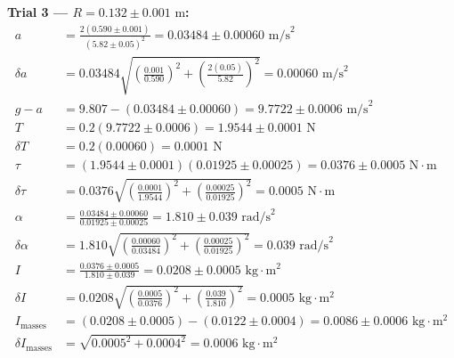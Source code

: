 \documentclass[11pt]{article}
\begin{document}
\textbf{Trial 3 — $R = 0.132 \pm 0.001\text{ m}$:}
\begin{align*}
a &= \frac{2(0.590 \pm 0.001)}{(5.82 \pm 0.05)^2} = 0.03484 \pm 0.00060\text{ m/s}^2 \\
\delta a &= 0.03484\sqrt{\left(\frac{0.001}{0.590}\right)^2 + \left(\frac{2(0.05)}{5.82}\right)^2} = 0.00060\text{ m/s}^2 \\
g - a &= 9.807 - (0.03484 \pm 0.00060) = 9.7722 \pm 0.0006\text{ m/s}^2 \\
T &= 0.2(9.7722 \pm 0.0006) = 1.9544 \pm 0.0001\text{ N} \\
\delta T &= 0.2(0.00060) = 0.0001\text{ N} \\
\tau &= (1.9544 \pm 0.0001)(0.01925 \pm 0.00025) = 0.0376 \pm 0.0005\text{ N}\cdot\text{m} \\
\delta\tau &= 0.0376\sqrt{\left(\frac{0.0001}{1.9544}\right)^2 + \left(\frac{0.00025}{0.01925}\right)^2} = 0.0005\text{ N}\cdot\text{m} \\
\alpha &= \frac{0.03484 \pm 0.00060}{0.01925 \pm 0.00025} = 1.810 \pm 0.039\text{ rad/s}^2 \\
\delta\alpha &= 1.810\sqrt{\left(\frac{0.00060}{0.03484}\right)^2 + \left(\frac{0.00025}{0.01925}\right)^2} = 0.039\text{ rad/s}^2 \\
I &= \frac{0.0376 \pm 0.0005}{1.810 \pm 0.039} = 0.0208 \pm 0.0005\text{ kg}\cdot\text{m}^2 \\
\delta I &= 0.0208\sqrt{\left(\frac{0.0005}{0.0376}\right)^2 + \left(\frac{0.039}{1.810}\right)^2} = 0.0005\text{ kg}\cdot\text{m}^2 \\
I_{\text{masses}} &= (0.0208 \pm 0.0005) - (0.0122 \pm 0.0004) = 0.0086 \pm 0.0006\text{ kg}\cdot\text{m}^2 \\
\delta I_{\text{masses}} &= \sqrt{0.0005^2 + 0.0004^2} = 0.0006\text{ kg}\cdot\text{m}^2
\end{align*}
\end{document}
